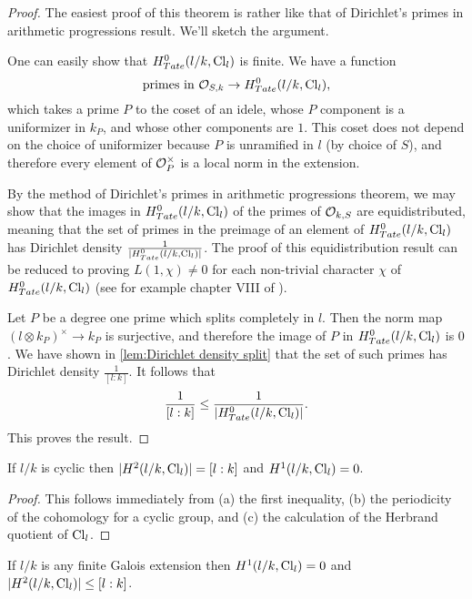 \begin{proof}
	The easiest proof of this theorem is rather like that of Dirichlet's primes in arithmetic
	progressions result.
	We'll sketch the argument.

	One can easily show that $H^0_{Tate}(l/k, \mathrm{Cl}_{l})$ is finite.
	We have a function
	\[
		\textrm{primes in ${\mathcal O}_{S,k}$} \to H^0_{Tate}(l/k, \mathrm{Cl}_{l}),
	\]
	which takes a prime $P$ to the coset of an idele, whose $P$ component is
	a uniformizer in $k_P$, and whose other components are $1$.
	This coset does not depend on the choice of uniformizer because $P$ is unramified in $l$
	(by choice of $S$), and therefore every element of ${\mathcal O}_P^\times$ is a local norm in the extension.

	By the method of Dirichlet's primes in arithmetic progressions theorem, we may show that
	the images in $H^0_{Tate}(l/k, \mathrm{Cl}_{l})$ of the primes of ${\mathcal O}_{k,S}$ are equidistributed,
	meaning that the set of primes in the preimage of an element of $H^0_{Tate}(l/k, \mathrm{Cl}_{l})$ has
	Dirichlet density $\frac{1}{|H^0_{Tate}(l/k, \mathrm{Cl}_{l})|}$. The proof of this equidistribution
	result can be reduced to proving $L(1,\chi) \ne 0$ for each non-trivial character
	$\chi$ of $H^0_{Tate}(l/k,\mathrm{Cl}_l)$ (see for example chapter VIII of \cite{cassells frohlich}).

	Let $P$ be a degree one prime which splits completely in $l$.
	Then the norm map $(l \otimes k_P)^\times \to k_P$ is surjective,
	and therefore the image of $P$ in $H^0_{Tate}(l/k, \mathrm{Cl}_{l})$ is $0$.
	We have shown in \ref{lem:Dirichlet density split} that the set of such primes has
	Dirichlet density $\frac{1}{[l:k]}$. It follows that
	\[
		\frac{1}{[l:k]} \le \frac{1}{|H^0_{Tate}(l/k, \mathrm{Cl}_{l})|}.
	\]
	This proves the result.
\end{proof}


\begin{corollary} \label{cor:H1 H2 cyclic idele class}
	If $l/k$ is cyclic then $|H^2(l/k, \mathrm{Cl}_{l})| = [l:k]$ and $H^1(l/k, \mathrm{Cl}_{l}) = 0$.
\end{corollary}

\begin{proof}
	This follows immediately from (a) the first inequality, (b) the periodicity of
	the cohomology for a cyclic group, and (c) the calculation of the Herbrand quotient
	of $\mathrm{Cl}_{l}$.
\end{proof}

\begin{theorem}
	If $l/k$ is any finite Galois extension then $H^1(l/k, \mathrm{Cl}_{l}) = 0$
	and $|H^2(l/k, \mathrm{Cl}_{l})| \le [l:k]$.
\end{theorem}


